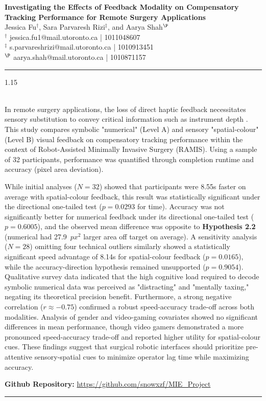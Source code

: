 \documentclass[a4paper,12pt]{article}
\makeatletter
\renewenvironment{abstract}%
 {\par\noindent\textbf{\abstractname}\ \ignorespaces \\}
 {\par\noindent\medskip}
\def\maketitle{
    \begin{flushleft}
        {\LARGE \textbf{Investigating the Effects of Feedback Modality on Compensatory Tracking Performance for Remote Surgery Applications}}\\[1cm]

        {\large Jessica Fu$^\dagger$, Sara Parvaresh Rizi$^\ddagger$, and Aarya Shah$^\P$}\\[0.5cm]

        {\small
        $^\dagger$ jessica.fu1@mail.utoronto.ca | 1011048607\\
        $^\ddagger$ s.parvareshrizi@mail.utoronto.ca | 1010913451\\
        $^\P$ aarya.shah@mail.utoronto.ca | 1010871157
        }
    \end{flushleft}
}
\makeatother
\begin{document}
\raggedbottom
\maketitle 
\thispagestyle{firstpage}
\noindent\rule{\textwidth}{0.4pt}
\begin{spacing}{1.15}
\begin{abstract}
In remote surgery applications, the loss of direct haptic feedback necessitates sensory substitution to convey critical information such as instrument depth \cite{bethea2004haptic}. This study compares symbolic "numerical" (Level A) and sensory "spatial-colour" (Level B) visual feedback on compensatory tracking performance within the context of Robot-Assisted Minimally Invasive Surgery (RAMIS). Using a sample of 32 participants, performance was quantified through completion runtime and accuracy (pixel area deviation). 

While initial analyses ($N=32$) showed that participants were 8.55s faster on average with spatial-colour feedback, this result was statistically significant under the directional one-tailed test ($p = 0.0293$ for time). Accuracy was not significantly better for numerical feedback under its directional one-tailed test ($p = 0.6005$), and the observed mean difference was opposite to \textbf{Hypothesis 2.2} (numerical had 27.9~$px^2$ larger area off target on average). A sensitivity analysis ($N=28$) omitting four technical outliers similarly showed a statistically significant speed advantage of 8.14s for spatial-colour feedback ($p = 0.0165$), while the accuracy-direction hypothesis remained unsupported ($p = 0.9054$). Qualitative survey data indicated that the high cognitive load required to decode symbolic numerical data was perceived as "distracting" and "mentally taxing," negating its theoretical precision benefit. Furthermore, a strong negative correlation ($r \approx -0.75$) confirmed a robust speed-accuracy trade-off across both modalities. Analysis of gender and video-gaming covariates showed no significant differences in mean performance, though video gamers demonstrated a more pronounced speed-accuracy trade-off and reported higher utility for spatial-colour cues. These findings suggest that surgical robotic interfaces should prioritize pre-attentive sensory-spatial cues to minimize operator lag time while maximizing accuracy.

\noindent \textbf{Github Repository:} \url{https://github.com/snowxzf/MIE_Project}
\end{abstract}
\end{spacing}
\noindent\rule{\textwidth}{0.4pt}
\end{document}
